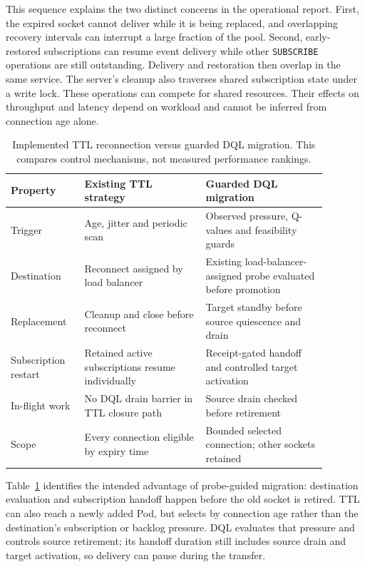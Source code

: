 This sequence explains the two distinct concerns in the operational report.
First, the expired socket cannot deliver while it is being replaced, and
overlapping recovery intervals can interrupt a large fraction of the pool.
Second, early-restored subscriptions can resume event delivery while other
\texttt{SUBSCRIBE} operations are still outstanding. Delivery and restoration
then overlap in the same service. The server's cleanup also traverses shared
subscription state under a write lock. These operations can compete for shared resources. Their effects on throughput
and latency depend on workload and cannot be inferred from connection age alone.

\begin{table}[!htbp]
  \centering
  \small
  \renewcommand{\arraystretch}{1.18}
  \caption{Implemented TTL reconnection versus guarded DQL migration.
  This compares control mechanisms, not measured performance rankings.}
  \label{tab:ttl-mechanism-comparison}
  \begin{tabular}{p{0.20\linewidth}p{0.34\linewidth}p{0.34\linewidth}}
    \toprule
    Property & Existing TTL strategy & Guarded DQL migration \\
    \midrule
    Trigger & Age, jitter and periodic scan & Observed pressure, Q-values and feasibility guards \\
    Destination & Reconnect assigned by load balancer & Existing load-balancer-assigned probe evaluated before promotion \\
    Replacement & Cleanup and close before reconnect & Target standby before source quiescence and drain \\
    Subscription restart & Retained active subscriptions resume individually & Receipt-gated handoff and controlled target activation \\
    In-flight work & No DQL drain barrier in TTL closure path & Source drain checked before retirement \\
    Scope & Every connection eligible by expiry time & Bounded selected connection; other sockets retained \\
    \bottomrule
  \end{tabular}
\end{table}
\FloatBarrier

Table~\ref{tab:ttl-mechanism-comparison} identifies the intended advantage of
probe-guided migration: destination evaluation and subscription handoff happen
before the old socket is retired. TTL can also reach a newly added Pod, but
selects by connection age rather than the destination's subscription or backlog
pressure. DQL evaluates that pressure and controls source retirement; its
handoff duration still includes source drain and target activation, so delivery
can pause during the transfer.

